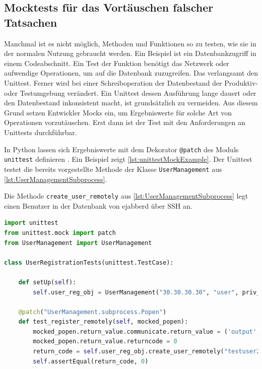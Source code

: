 \documentclass[a4paper,titlepage,halfparskip,12pt]{scrreprt}
\begin{document}
\begin{onehalfspacing}
\section{Mocktests für das Vortäuschen falscher Tatsachen}

Manchmal ist es nicht möglich, Methoden und Funktionen so zu testen, wie sie in der normalen Nutzung gebraucht werden. Ein Beispiel ist ein Datenbankzugriff in einem Codeabschnitt. Ein Test der Funktion benötigt das Netzwerk oder aufwendige Operationen, um auf die Datenbank zuzugreifen. Das verlangsamt den Unittest. Ferner wird bei einer Schreiboperation der Datenbestand der Produktiv- oder Testumgebung verändert. Ein Unittest dessen Ausführung lange dauert oder den Datenbestand inkonsistent macht, ist grundsätzlich zu vermeiden. Aus diesem Grund setzen Entwickler Mocks ein, um Ergebniswerte für solche Art von Operationen vorzutäuschen. Erst dann ist der Test mit den Anforderungen an Unittests durchführbar.\cite{hubertz2016softwaretests}

\pagebreak

In Python lassen sich Ergebniswerte mit dem Dekorator \texttt{@patch} des Moduls \texttt{unittest} definieren \cite{hubertz2016softwaretests}. Ein Beispiel zeigt \autoref{lst:unittestMockExample}. Der Unittest testet die bereits vorgestellte Methode der Klasse \texttt{UserManagement} aus \autoref{lst:UserManagementSubprocess}. 

Die Methode \texttt{create\_user\_remotely} aus \autoref{lst:UserManagementSubprocess} legt einen Benutzer in der Datenbank von ejabberd über \acs{SSH} an.

\begin{lstlisting}[language=python, caption={Beispiel: Unittest für eine Methode zur Überprüfung eines Benutzernamens}, label={lst:unittestMockExample}]
import unittest
from unittest.mock import patch
from UserManagement import UserManagement

class UserRegistrationTests(unittest.TestCase):

    def setUp(self):
        self.user_reg_obj = UserManagement("30.30.30.30", "user", priv_key="privkey_file", sudo_passwd="passwd")

    @patch("UserManagement.subprocess.Popen")
    def test_register_remotely(self, mocked_popen):
        mocked_popen.return_value.communicate.return_value = ('output', 'error')
        mocked_popen.return_value.returncode = 0
        return_code = self.user_reg_obj.create_user_remotely("testuser2", "hallo123", "ejabberd-server")
        self.assertEqual(return_code, 0)
\end{lstlisting}


\end{onehalfspacing}
\end{document}
